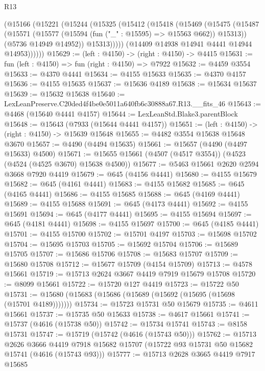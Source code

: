 \begin{lexlean}{R13}
\begin{coremodule}
        (@15166
          (@15221
            (@15244
              (@15325
                (@15412
                  (@15418
                    (@15469
                      (@15475
                        (@15487
                          (@15571 (@15577 (@15594 (fun ("_" : @15595) => @15563 @662)) @15313))
                          (@5736 @14949 @14952))
                        @15313)))))
              (@14409 @14938 @14941 @4441 @14944 @14953))))))
@15629 := (left : @4150) -> (right : @4150) -> @4415
@15631 := fun (left : @4150) => fun (right : @4150) => @7922
@15632 := @4459 @3554
@15633 := @4370 @4441
@15634 := @4155 @15633
@15635 := @4370 @4157
@15636 := @4155 @15635
@15637 := @15636 @4189
@15638 := @15634 @15637
@15639 := @15632 @15638
@15640 := LexLeanPreserve.C20ded4f4be0e5011a640fb6c30888a67.R13.__fits_46
@15643 := @4468 (@15640 @4441 @4157)
@15644 := LexLeanStd.Blake3.parentBlock
@15648 := @15643 (@7933 (@15644 @4441 @4157))
@15651 := (left : @4150) -> (right : @4150) -> @15639 @15648
@15655 := @4482 @3554 @15638 @15648 @3670
@15657 := @4490 (@4494 @15635)
@15661 := @15657 (@4490 (@4497 @15633) @4500)
@15671 := @15655 @15661 (@4507 (@4517 @3554)) (@4523 (@4524 (@4525 @3670) @15638 @4500))
@15677 := @5463 @15661 @2620 @2594 @3668 @7920 @4419
@15679 := @645 (@4156 @4441)
@15680 := @4155 @15679
@15682 := @645 (@4161 @4441)
@15683 := @4155 @15682
@15685 := @645 (@4165 @4441)
@15686 := @4155 @15685
@15688 := @645 (@4169 @4441)
@15689 := @4155 @15688
@15691 := @645 (@4173 @4441)
@15692 := @4155 @15691
@15694 := @645 (@4177 @4441)
@15695 := @4155 @15694
@15697 := @645 (@4181 @4441)
@15698 := @4155 @15697
@15700 := @645 (@4185 @4441)
@15701 := @4155 @15700
@15702 := @15701 @4197
@15703 := @15698 @15702
@15704 := @15695 @15703
@15705 := @15692 @15704
@15706 := @15689 @15705
@15707 := @15686 @15706
@15708 := @15683 @15707
@15709 := @15680 @15708
@15712 := @15677 @15709 (@4154 @15709)
@15713 := @4578 @15661
@15719 := @15713 @2624 @3667 @4419 @7919 @15679 @15708
@15720 := @8099 @15661
@15722 := @15720 @127 @4419
@15723 := @15722 @50
@15731 := @15680 (@15683 (@15686 (@15689 (@15692 (@15695 (@15698 (@15701 @4189)))))))
@15734 := @15723 @15731 @50 @15679
@15735 := @4611 @15661
@15737 := @15735 @50 @15633
@15738 := @4617 @15661
@15741 := @15737 (@4616 (@15738 @50))
@15742 := @15734 @15741
@15743 := @8158 @15731
@15747 := @15719 (@15742 (@4616 (@15743 @50)))
@15762 := @15713
    @2626
    @3666
    @4419
    @7918
    @15682
    @15707
    (@15722 @93 @15731 @50 @15682 @15741 (@4616 (@15743 @93)))
@15777 := @15713
    @2628
    @3665
    @4419
    @7917
    @15685

\end{coremodule}
\end{lexlean}
